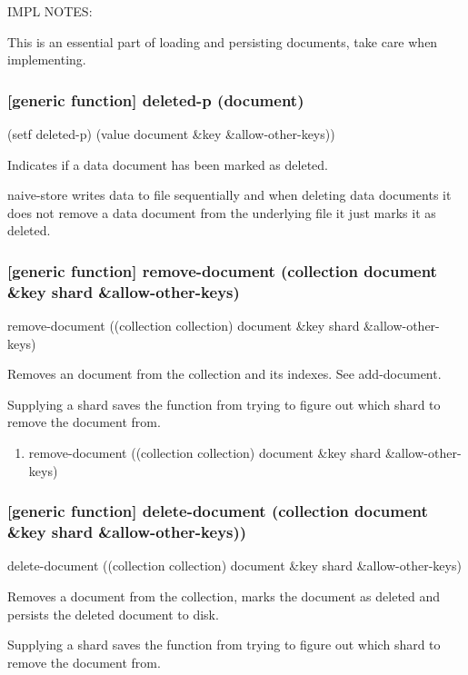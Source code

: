 \documentclass[11pt]{article}
\begin{document}
IMPL NOTES:

This is an essential part of loading and persisting documents, take
care when implementing.

\subsubsection{[generic function] deleted-p (document)}
\label{sec:org3e648b3}

(setf deleted-p) (value document \&key \&allow-other-keys))

Indicates if a data document has been marked as deleted.

naive-store writes data to file sequentially and when deleting data
documents it does not remove a data document from the underlying file
it just marks it as deleted.

\subsubsection{[generic function] remove-document (collection document \&key shard \&allow-other-keys)}
\label{sec:org910edb8}

remove-document ((collection collection) document \&key shard \&allow-other-keys)

Removes an document from the collection and its indexes. See add-document.

Supplying a shard saves the function from trying to figure out which
shard to remove the document from.

\begin{enumerate}
\item remove-document ((collection collection) document \&key shard \&allow-other-keys)
\label{sec:orgcc1b905}
\end{enumerate}

\subsubsection{[generic function] delete-document (collection document \&key shard \&allow-other-keys))}
\label{sec:org2713fa0}

delete-document ((collection collection) document \&key shard \&allow-other-keys)

Removes a document from the collection, marks the document as deleted
and persists the deleted document to disk.

Supplying a shard saves the function from trying to figure out which
shard to remove the document from.
\end{document}
